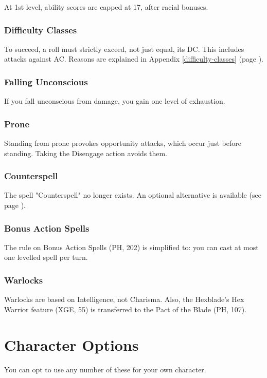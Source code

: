 \documentclass[letterpaper,twocolumn,openany,nodeprecatedcode,bg=print]{dndbook}
\newcommand{\pg}[1]{page \pageref{#1}}
\newcommand{\see}[1]{(see \pg{#1})}
\begin{document}
At 1st level, ability scores are capped at 17, after racial bonuses.

\subsection{Difficulty Classes}
To succeed, a roll must strictly exceed, not just equal, its DC. This includes attacks against AC. Reasons are explained in Appendix \ref{difficulty-classes} (\pg{difficulty-classes}).

\subsection{Falling Unconscious}
If you fall unconscious from damage, you gain one level of exhaustion.

\subsection{Prone}
Standing from prone provokes opportunity attacks, which occur just before standing. Taking the Disengage action avoids them.

\subsection{Counterspell}
The spell "Counterspell" no longer exists. An optional alternative is available \see{counterspell}.

\subsection{Bonus Action Spells}
The rule on Bonus Action Spells (PH, 202) is simplified to: you can cast at most one levelled spell per turn.

\subsection{Warlocks}
Warlocks are based on Intelligence, not Charisma. Also, the Hexblade's Hex Warrior feature (XGE, 55) is transferred to the Pact of the Blade (PH, 107).










\chapter{Character Options}
\noindent You can opt to use any number of these for your own character.
\end{document}
